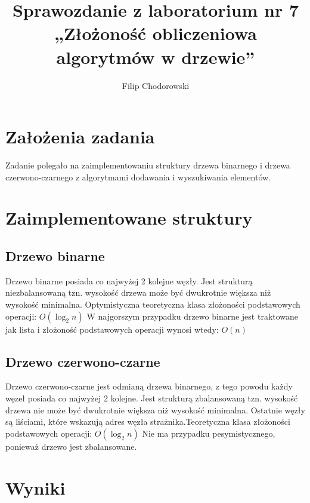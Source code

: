 \documentclass[a4paper,11pt]{article}
\author{Filip Chodorowski}
\title{Sprawozdanie z laboratorium nr 7\\
„Złożoność obliczeniowa algorytmów w drzewie”}
\begin{document}
\maketitle
\tableofcontents
\section{Założenia zadania}
Zadanie polegało na zaimplementowaniu struktury drzewa binarnego i drzewa czerwono-czarnego z algorytmami dodawania i wyszukiwania elementów.
\newpage
\section{Zaimplementowane struktury}
\subsection{Drzewo binarne}
Drzewo binarne posiada co najwyżej 2 kolejne węzły. Jest strukturą niezbalansowaną tzn. wysokość drzewa może być dwukrotnie większa niż wysokość minimalna. Optymistyczna teoretyczna klasa złożoności podstawowych operacji:
$O(\log_2 n) 
$
W najgorszym przypadku drzewo binarne jest traktowane jak lista i złożoność podstawowych operacji wynosi wtedy:
$O(n) 
$
\subsection{Drzewo czerwono-czarne}
Drzewo czerwono-czarne jest odmianą drzewa binarnego, z tego powodu każdy węzeł posiada co najwyżej 2 kolejne. Jest strukturą zbalansowaną tzn. wysokość drzewa nie może być dwukrotnie większa niż wysokość minimalna. Ostatnie węzły są liściami, które wskazują adres węzła strażnika.Teoretyczna klasa złożoności podstawowych operacji:
$O(\log_2 n)
$
Nie ma przypadku pesymistycznego, ponieważ drzewo jest zbalansowane.
\newpage
\section{Wyniki}
\end{document}
